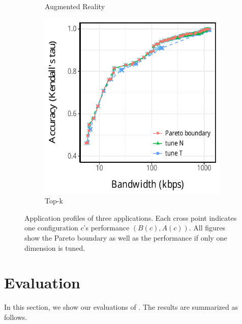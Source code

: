 \begin{figure}[htb]
\begin{subfigure}[t]{0.33\textwidth}
    \caption{Augmented Reality}
    \label{fig:ar-profile}
  \end{subfigure}
  \hfill
  \begin{subfigure}[t]{0.33\textwidth}
    \centering
    \includegraphics[width=\textwidth]{figures/profile-topk.pdf}
    \caption{Top-k}
    \label{fig:tk-profile}
  \end{subfigure}
  \caption{Application profiles of three applications. Each cross point
    indicates one configuration $c$'s performance $(B(c), A(c))$. All figures
    show the Pareto boundary as well as the performance if only one dimension is
    tuned.}
  \label{fig:all-profiles}
\end{figure}

\newpage

\section{Evaluation}
\label{sec:evaluation}

In this section, we show our evaluations of \sysname{}. The results are
summarized as follows.

